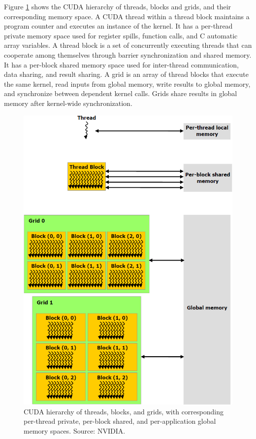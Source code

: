 Figure \ref{GPU:CUDAMemoryHierarchy} shows the CUDA hierarchy of threads, blocks and grids, and their corresponding memory space. A CUDA thread within a thread block maintains a program counter and executes an instance of the kernel. It has a per-thread private memory space used for register spills, function calls, and C automatic array variables. A thread block is a set of concurrently executing threads that can cooperate among themselves through barrier synchronization and shared memory. It has a per-block shared memory space used for inter-thread communication, data sharing, and result sharing. A grid is an array of thread blocks that execute the same kernel, read inputs from global memory, write results to global memory, and synchronize between dependent kernel calls. Grids share results in global memory after kernel-wide synchronization.

\begin{figure}
\centering
\includegraphics[width=\textwidth]{GPU/CUDAMemoryHierarchy.png}
\caption{CUDA hierarchy of threads, blocks, and grids, with corresponding per-thread private, per-block shared, and per-application global memory spaces. Source: NVIDIA.}
\label{GPU:CUDAMemoryHierarchy}
\end{figure}

